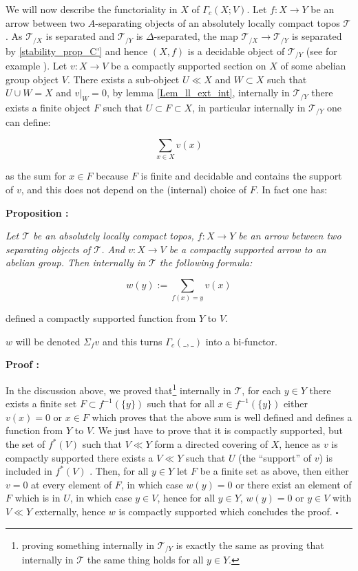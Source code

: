 \documentclass[a4paper]{article}
\newcommand{\Tcal}{\mathcal{T}}
\newcommand{\block}[1]
{

\par \subsubsection{} #1

\bigskip}
\newcommand{\Prop}[1]
	{

	\bigskip
	
	\textbf{Proposition : }{\itshape #1}
		
	\bigskip
	
	}
\newcommand{\Dem}[1]{
	
	\smallskip
	
	\textbf{Proof : } \par
	 {#1} $\square$
	 
	 \bigskip
}
\begin{document}
\block{\label{Gamma_functo_left}We will now describe the functoriality in $X$ of $\Gamma_c(X;V)$. Let $f : X \rightarrow Y$ be an arrow between two $A$-separating objects of an absolutely locally compact topos $\Tcal$. As $\Tcal_{/X}$ is separated and $\Tcal_{/Y}$ is $\Delta$-separated, the map $\Tcal_{/X} \rightarrow \Tcal_{/Y}$ is separated by \ref{stability_prop_C'} and hence $(X,f)$ is a decidable object of $\Tcal_{/Y}$ (see for example \cite[II.1.3]{moerdijk2000proper}). Let $v:X \rightarrow V$ be a compactly supported section on $X$ of some abelian group object $V$. There exists a sub-object $U \ll X$ and $W \subset X$ such that $U \cup W = X$ and $v|_W=0$, by lemma \ref{Lem_ll_ext_int}, internally in $\Tcal_{/Y}$ there exists a finite object $F$ such that $U \subset F \subset X$, in particular internally in $\Tcal_{/Y}$ one can define:

\[ \sum_{x \in X} v(x)  \]

as the sum for $x \in F$ because $F$ is finite and decidable and contains the support of $v$, and this does not depend on the  (internal) choice of $F$. In fact one has:


\Prop{Let $\Tcal$ be an absolutely locally compact topos, $f :X \rightarrow Y$ be an arrow between two separating objects of $\Tcal$. And $v:X \rightarrow V$ be a compactly supported arrow to an abelian group. Then internally in $\Tcal$ the following formula:

\[ w(y) := \sum_{f(x) = y} v(x) \]

defined a compactly supported function from $Y$ to $V$.
}

$w$ will be denoted $\Sigma_f v$ and this turns $\Gamma_c( \_ , \_)$ into a bi-functor.

 
\Dem{In the discussion above, we proved that\footnote{proving something internally in $\Tcal_{/Y}$ is exactly the same as proving that internally in $\Tcal$ the same thing holds for all $y \in Y$.} internally in $\Tcal$, for each $y \in Y$ there exists a finite set $F \subset f^{-1}(\{y\})$ such that for all $x \in f^{-1}(\{y\})$ either $v(x)=0$ or $x \in F$ which proves that the above sum is well defined and defines a function from $Y$ to $V$. We just have to prove that it is compactly supported, but the set of $f^*(V)$ such that $V \ll Y$ form a directed covering of $X$, hence as $v$ is compactly supported there exists a  $V \ll Y$ such that $U$ (the ``support'' of $v$) is included in $f^*(V)$ . Then, for all $y \in Y$ let $F$ be a finite set as above, then either $v=0$ at every element of $F$, in which case $w(y)=0$ or there exist an element of $F$ which is in $U$, in which case $y \in V$, hence for all $y \in Y$, $w(y)=0$ or $y \in V$ with $V \ll Y$ externally, hence $w$ is compactly supported which concludes the proof. }
}
\end{document}
